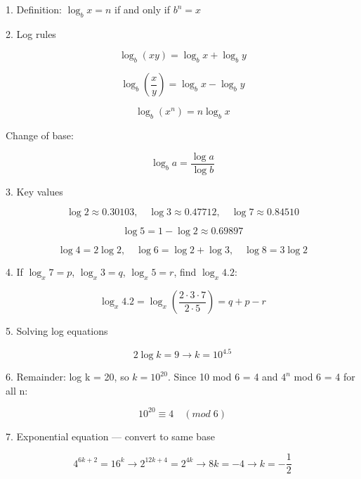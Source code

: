1. Definition: $\log_b x = n$ if and only if $b^n = x$

2. Log rules

$$ \log_b(xy) = \log_b x + \log_b y $$

$$ \log_b \left( \frac{x}{y} \right) = \log_b x - \log_b y $$

$$ \log_b(x^n) = n \log_b x $$

Change of base:

$$ \log_b a = \frac{\log a}{\log b} $$

3. Key values

$$ \log 2 \approx 0.30103, \quad \log 3 \approx 0.47712, \quad \log 7 \approx 0.84510 $$

$$ \log 5 = 1 - \log 2 \approx 0.69897 $$

$$ \log 4 = 2\log 2, \quad \log 6 = \log 2 + \log 3, \quad \log 8 = 3\log 2 $$

4. If $\log_x 7 = p$, $\log_x 3 = q$, $\log_x 5 = r$, find $\log_x 4.2$:

$$ \log_x 4.2 = \log_x \left( \frac{2 \cdot 3 \cdot 7}{2 \cdot 5} \right) = q + p - r $$

5. Solving log equations

$$ 2\log k = 9 \rightarrow k = 10^{4.5} $$

6. Remainder: log k = 20, so $k = 10^{20}$. Since 10 mod 6 = 4 and $4^n$ mod 6 = 4 for all n:

$$ 10^{20} \equiv 4 \quad (mod \; 6) $$

7. Exponential equation — convert to same base

$$ 4^{6k+2} = 16^k \rightarrow 2^{12k+4} = 2^{4k} \rightarrow 8k = -4 \rightarrow k = -\frac{1}{2} $$
